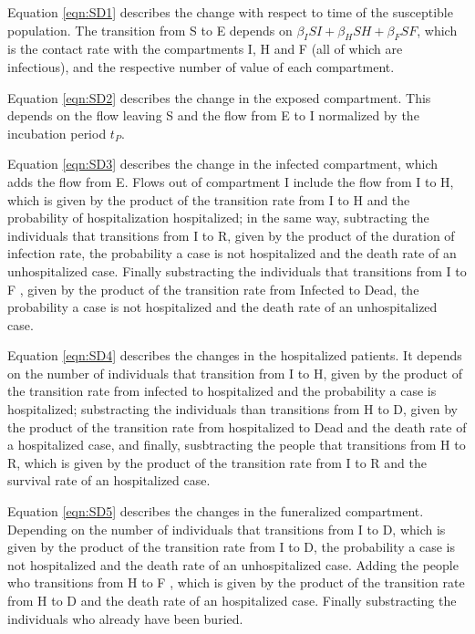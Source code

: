 

%



Equation \ref{eqn:SD1} describes the change with respect to time of the susceptible population. The transition from S to E depends on $\beta_{I}SI+\beta_{H}SH+\beta_{F}SF$, which is the contact rate with the compartments I, H and F (all of which are infectious), and the respective number of value of each compartment.

Equation \ref{eqn:SD2} describes the change in the exposed compartment. This depends on the flow leaving S and the flow from E to I normalized by the incubation period $t_P$.

Equation \ref{eqn:SD3} describes the change in the infected compartment, which adds the flow from E. Flows out of compartment I include the flow from I to H, which is given by the product of the transition rate from I to H and the probability of hospitalization hospitalized; in the same way, subtracting the individuals that transitions from I to R, given by  the product of the duration of infection rate, the probability a case is not hospitalized and the death rate of an unhospitalized case. Finally substracting the individuals that transitions from I to F , given by the product of the transition rate from Infected to Dead,  the probability a case is not hospitalized and the death rate of an unhospitalized case.

Equation \ref{eqn:SD4} describes the changes in the hospitalized patients. It depends on the number of individuals that transition from I to H, given by the  product of the transition rate from infected to hospitalized and the probability a case is hospitalized; substracting the individuals than transitions from H to D, given by the product of the transition rate from hospitalized to Dead and the death rate of a hospitalized case, and finally, susbtracting the people that transitions from H to R, which is given by the product of the transition rate from I to R and the survival rate of an hospitalized case.

Equation \ref{eqn:SD5} describes the changes in the funeralized compartment.  Depending on the number of individuals that transitions from I to D, which is given by the product of the transition rate from I to D, the probability a case is not hospitalized and the death rate of an unhospitalized case. Adding the people who transitions from H to F , which is given by the product of the transition rate from H to D and the death rate of an hospitalized case. Finally substracting the individuals who already have been buried.

